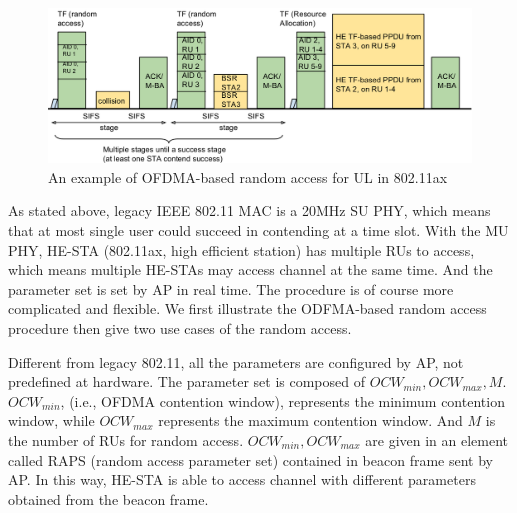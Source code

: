

\begin{figure}[!hb]
\centering
\includegraphics[scale=0.35]{./figure/RA_illu_2.png}
\caption{An example of OFDMA-based random access for UL in 802.11ax }
\label{fig_ra_ul}
\end{figure}

As stated above, legacy IEEE 802.11 MAC is a 20MHz SU PHY, which means that at most single user could succeed in contending at a time slot.
With the MU PHY, HE-STA (802.11ax, high efficient station) has multiple RUs to access, which means multiple HE-STAs may access channel at the same time.
And the parameter set is set by AP in real time.
The procedure is of course more complicated and flexible.
We first illustrate the ODFMA-based random access procedure then give two use cases of the random access.

Different from legacy 802.11, all the parameters are configured by AP, not predefined at hardware. 
The parameter set is composed of $OCW_{min}, OCW_{max}, M$. $OCW_{min}$, (i.e., OFDMA contention window), represents the minimum contention window, while $OCW_{max}$ represents the maximum contention window. 
And $M$ is the number of RUs for random access. $OCW_{min}, OCW_{max}$ are given in an element called RAPS (random access parameter set) contained in beacon frame sent by AP.
In this way, HE-STA is able to access channel with different parameters obtained from the beacon frame. 


